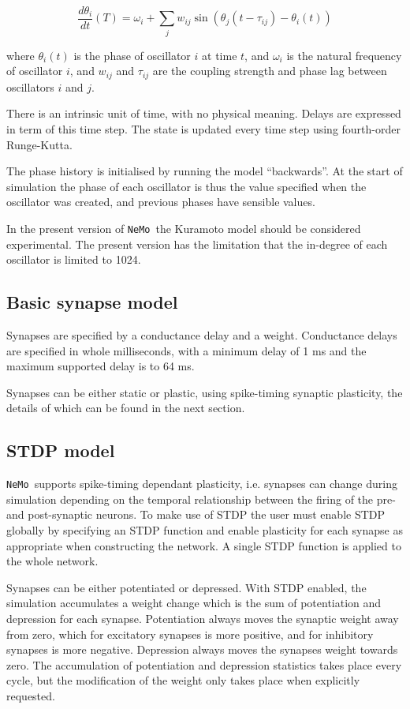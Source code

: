 \documentclass[a4paper]{article}
\newcommand{\nemo}{\texttt{NeMo}}
\begin{document}
\[
\frac{d\theta_i}{dt}(T) = \omega_i + \sum_{j} w_{ij} \sin(\theta_j(t-\tau_{ij}) - \theta_i(t)) 
\]

where
	$\theta_i(t)$ is the phase of oscillator $i$ at time $t$,
	and $\omega_i$ is the natural frequency of oscillator $i$, and
	$w_{ij}$ and $\tau_{ij}$ are the coupling strength and phase lag between oscillators $i$ and $j$.

There is an intrinsic unit of time, with no physical meaning.
Delays are expressed in term of this time step.
The state is updated every time step using fourth-order Runge-Kutta.

The phase history is initialised by running the model ``backwards''.
At the start of simulation the phase of each oscillator is thus the value specified when the oscillator was created,
	and previous phases have sensible values.

In the present version of \nemo\ the Kuramoto model should be considered experimental.
The present version has the limitation that the in-degree of each oscillator is limited to 1024.

\subsection{Basic synapse model}
\label{model:synapse}

Synapses are specified by a conductance delay and a weight.
Conductance delays are specified in whole milliseconds, 
	with a minimum delay of 1 ms
	and the maximum supported delay is to 64 ms.

Synapses can be either static or plastic,
	using spike-timing synaptic plasticity,
	the details of which can be found in the next section.

\subsection{STDP model}
\label{model:stdp}

\nemo\ supports spike-timing dependant plasticity,
	i.e. synapses can change during simulation depending on the temporal relationship 
between the firing of the pre- and post-synaptic neurons. 
To make use of STDP the user must enable STDP globally by specifying an STDP function
	and enable plasticity for each synapse as appropriate when constructing the network.
A single STDP function is applied to the whole network.

Synapses can be either potentiated or depressed.
With STDP enabled,
	the simulation accumulates a weight change
	which is the sum of potentiation and depression for each synapse. 
Potentiation always moves the synaptic weight away from zero,
	which for excitatory synapses is more positive,
	and for inhibitory synapses is more negative.
Depression always moves the synapses weight towards zero.
The accumulation of potentiation and depression statistics takes place every cycle,
	but the modification of the weight only takes place when explicitly requested.
\end{document}
